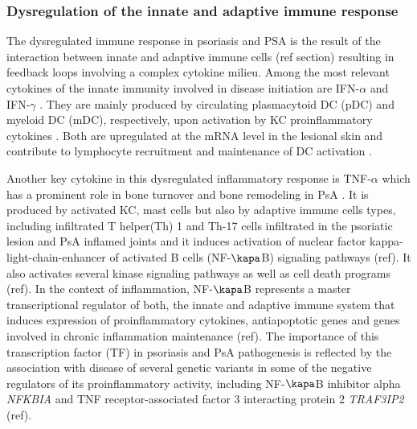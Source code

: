 \subsubsection*{Dysregulation of the innate and adaptive immune response}
The dysregulated  immune response in psoriasis and PSA is the result of the interaction between innate and adaptive immune cells (ref section) resulting in feedback loops involving a complex cytokine milieu. Among the most relevant cytokines of the innate immunity involved in disease initiation are IFN-$\alpha$ and IFN-$\gamma$ \parencite{Leanne2009}. They are mainly produced by circulating plasmacytoid DC (pDC) and myeloid DC (mDC), respectively, upon activation by KC proinflammatory cytokines \parencite{Perera2012}. Both are upregulated at the mRNA level in the lesional skin and contribute to lymphocyte recruitment and maintenance of DC activation \parencite{Schmid1994}. 

Another key cytokine in this dysregulated inflammatory response is TNF-$\alpha$ which has a prominent role in bone turnover and bone remodeling in PsA \parencite{Mensah2008}. It is produced by activated KC, mast cells but also by adaptive immune cells types, including infiltrated T helper(Th) 1 and Th-17 cells infiltrated in the psoriatic lesion and PsA inflamed joints \parencite{Perera2012} and it induces activation of nuclear factor kappa-light-chain-enhancer of activated B cells (NF-$\kapa$B) signaling pathways (ref). It also activates several kinase signaling pathways as well as cell death programs (ref). In the context of inflammation, NF-$\kapa$B represents a master transcriptional regulator of both, the innate and adaptive immune system that induces expression of proinflammatory cytokines, antiapoptotic genes and genes involved in chronic inflammation maintenance (ref). The importance of this transcription factor (TF) in psoriasis and PsA pathogenesis is reflected by the association with disease of several genetic variants in some of the negative regulators of its proinflammatory activity, including NF-$\kapa$B inhibitor alpha \textit{NFKBIA} and TNF receptor-associated factor 3 interacting protein 2 \textit{TRAF3IP2} (ref).
 
